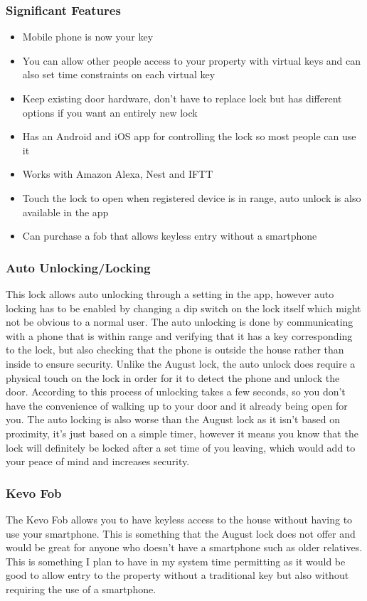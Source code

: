 \subsubsection*{Significant Features}
\begin{itemize}
	\item Mobile phone is now your key
	\item You can allow other people access to your property with virtual keys and can also set time constraints on each virtual key
	\item Keep existing door hardware, don't have to replace lock but has different options if you want an entirely new lock
	\item Has an Android and iOS app for controlling the lock so most people can use it
	\item Works with Amazon Alexa, Nest and IFTT
	\item Touch the lock to open when registered device is in range, auto unlock is also available in the app
	\item Can purchase a fob that allows keyless entry without a smartphone
\end{itemize}

\subsubsection*{Auto Unlocking/Locking}
This lock allows auto unlocking through a setting in the app, however auto locking has to be enabled by changing a dip switch on the lock itself which might not be obvious to a normal user. The auto unlocking is done by communicating with a phone that is within range and verifying that it has a key corresponding to the lock, but also checking that the phone is outside the house rather than inside to ensure security. Unlike the August lock, the auto unlock does require a physical touch on the lock in order for it to detect the phone and unlock the door. According to \cite{DeLooper2018} this process of unlocking takes a few seconds, so you don't have the convenience of walking up to your door and it already being open for you. The auto locking is also worse than the August lock as it isn't based on proximity, it's just based on a simple timer, however it means you know that the lock will definitely be locked after a set time of you leaving, which would add to your peace of mind and increases security.

\subsubsection*{Kevo Fob}
The Kevo Fob allows you to have keyless access to the house without having to use your smartphone. This is something that the August lock does not offer and would be great for anyone who doesn't have a smartphone such as older relatives. This is something I plan to have in my system time permitting as it would be good to allow entry to the property without a traditional key but also without requiring the use of a smartphone.

